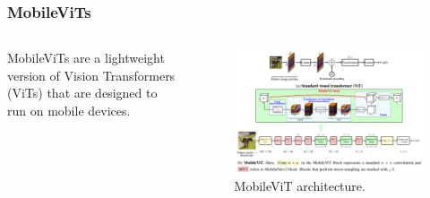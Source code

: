 \documentclass[english, xcolor={table}]{beamer}
\begin{document}
\begin{frame}
  \frametitle{MobileViTs}

  \begin{columns}
    \begin{column}{0.3\textwidth}
      \alert{MobileViTs}\cite{mehta_mobilevit_2022} are a lightweight version of Vision Transformers (ViTs) that are designed to run on \alert{mobile devices}.
    \end{column}
    \begin{column}{0.7\textwidth}
      \begin{figure}
        \centering
        \includegraphics[width=1\textwidth]{figures/arch.png}
        \caption{MobileViT architecture.}
      \end{figure}
    \end{column}
  \end{columns}
\end{frame}
\end{document}
